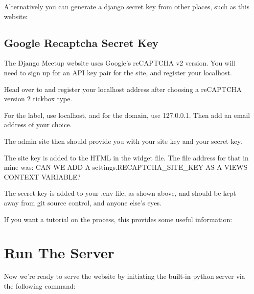 \documentclass[letterpaper,10pt,english]{sphinxmanual}
\begin{document}
Alternatively you can generate a django secret key from other places, such as this website:  


\subsection{Google Recaptcha Secret Key}
\label{\detokenize{guide/06_environment-variables:google-recaptcha-secret-key}}
The Django Meetup website uses Google’s reCAPTCHA v2 version.  You will need to sign up for an API key pair for the site, and register your localhost.

Head over to  and register your localhost address after choosing a reCAPTCHA version 2 tickbox type.

For the label, use localhost, and for the domain, use 127.0.0.1.  Then add an email address of your choice.

The admin site then should provide you with your site key and your secret key.

The site key is added to the HTML in the widget file.  The file address for that in mine was:
CAN WE ADD A settings.RECAPTCHA\_SITE\_KEY AS A VIEWS CONTEXT VARIABLE?

\begin{sphinxVerbatim}[commandchars=\\\{\}]

\end{sphinxVerbatim}

The secret key is added to your .env file, as shown above, and should be kept away from git source control, and anyone else’s eyes.

If you want a tutorial on the process, this provides some useful information: 


\section{Run The Server}
\label{\detokenize{guide/07_runserver:run-the-server}}\label{\detokenize{guide/07_runserver::doc}}
Now we’re ready to serve the website by initiating the built-in python server via the following command:
\end{document}
